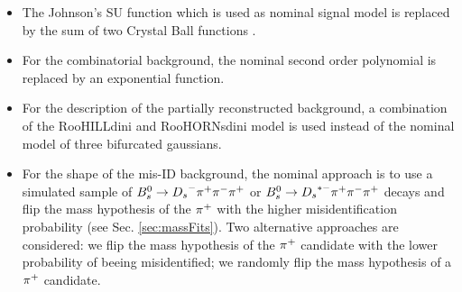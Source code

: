 \begin{itemize}

\item The \textsf{Johnson's SU} function which is used as nominal signal model is replaced by the sum of two \textsf{Crystal Ball} functions \cite{CB}. 

\item For the combinatorial background, the nominal second order polynomial is replaced by an exponential function. 

\item For the description of the partially reconstructed background, 
a combination of the \textsf{RooHILLdini} and \textsf{RooHORNsdini} model \cite{Hill:2253246} is used instead of the nominal model of three bifurcated gaussians. 

\item For the shape of the mis-ID background, 
the nominal approach is to use a simulated sample of ${{B}^0_{s}}\rightarrow{\ensuremath{{D}_{s}}}^{-}{{\pi}^+}{{\pi}^-}{{\pi}^+}$ or ${{B}^0_{s}}\rightarrow{\ensuremath{{D}_{s}}}^{*-}{{\pi}^+}{{\pi}^-}{{\pi}^+}$ 
decays and flip the mass hypothesis of the ${{\pi}^+}$ with the higher misidentification probability (see Sec. \ref{sec:massFits}). 
Two alternative approaches are considered:
we flip the mass hypothesis of the ${{\pi}^+}$ candidate with the lower probability of beeing misidentified; we randomly flip the mass hypothesis of a ${{\pi}^+}$ candidate.

\end{itemize}
%
